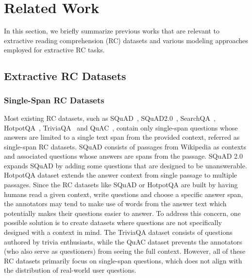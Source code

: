 \documentclass[a4paper]{cas-sc}
\newcommand{\1}[1]{\mathds{1}\left[#1\right]}
\begin{document}
%	
\section{Related Work}
\label{sec:related}
In this section, we briefly summarize previous works that are relevant to extractive reading comprehension (RC) datasets and various modeling approaches employed for extractive RC tasks.
\subsection{Extractive RC Datasets}
\label{sec:related_dataset}
\subsubsection{Single-Span RC Datasets}
Most existing RC datasets, such as SQuAD~\citep{rajpurkar2016squad}, SQuAD2.0~\citep{rajpurkar2018know}, SearchQA~\citep{DBLP:journals/corr/DunnSHGCC17}, HotpotQA~\citep{yang2018hotpotqa}, TriviaQA~\citep{DBLP:conf/acl/JoshiCWZ17} and QuAC~\citep{DBLP:conf/emnlp/ChoiHIYYCLZ18}, contain only single-span questions whose answers are limited to a single text span from the provided context, referred as single-span RC datasets. 
SQuAD consists of passages from Wikipedia as contexts and associated questions whose answers are spans from the passage. SQuAD 2.0 expands SQuAD by adding some questions that are designed to be unanswerable.
HotpotQA dataset extends the answer context from single passage to multiple passages. Since the RC datasets like SQuAD or HotpotQA are built by having humans read a given context, write questions and choose a specific answer span, the annotators may tend to make use of words from the answer text which potentially makes  their questions easier to answer.  
To address this concern, one possible solution is to create datasets where questions are not specifically designed with a context in mind. 
The TriviaQA dataset consists of questions authored by trivia enthusiasts, while the QuAC dataset prevents the annotators (who also serve as questioners) from seeing the full context.
However, all of these RC datasets primarily focus on single-span questions, which does not align with the distribution of real-world user questions. 
\end{document}
